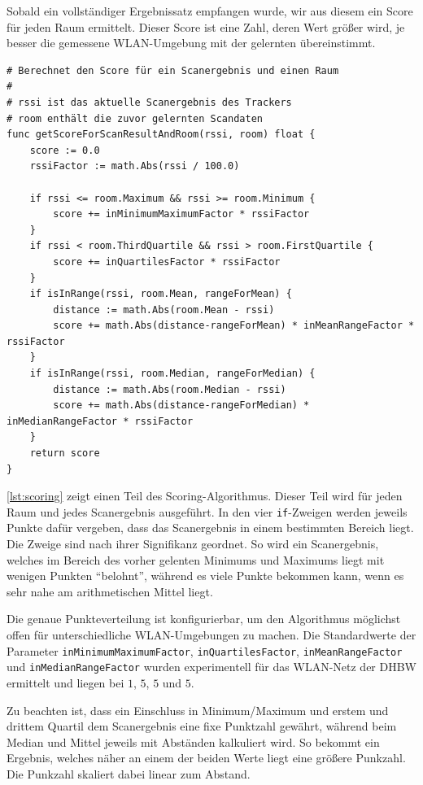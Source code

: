 Sobald ein vollständiger Ergebnissatz empfangen wurde, wir aus diesem ein Score für jeden Raum
ermittelt. Dieser Score ist eine Zahl, deren Wert größer wird, je besser die gemessene
\gls{WLAN}-Umgebung mit der gelernten übereinstimmt.

\begin{lstlisting}[caption={Pseudocode-Beschreibung der Scoring-Funktion},label={lst:scoring},tabsize=2]
# Berechnet den Score für ein Scanergebnis und einen Raum
#
# rssi ist das aktuelle Scanergebnis des Trackers
# room enthält die zuvor gelernten Scandaten
func getScoreForScanResultAndRoom(rssi, room) float {
	score := 0.0
	rssiFactor := math.Abs(rssi / 100.0)

	if rssi <= room.Maximum && rssi >= room.Minimum {
		score += inMinimumMaximumFactor * rssiFactor
	}
	if rssi < room.ThirdQuartile && rssi > room.FirstQuartile {
		score += inQuartilesFactor * rssiFactor
	}
	if isInRange(rssi, room.Mean, rangeForMean) {
		distance := math.Abs(room.Mean - rssi)
		score += math.Abs(distance-rangeForMean) * inMeanRangeFactor * rssiFactor
	}
	if isInRange(rssi, room.Median, rangeForMedian) {
		distance := math.Abs(room.Median - rssi)
		score += math.Abs(distance-rangeForMedian) * inMedianRangeFactor * rssiFactor
	}
	return score
}
\end{lstlisting}

\autoref{lst:scoring} zeigt einen Teil des Scoring-Algorithmus. Dieser Teil wird für jeden Raum und
jedes Scanergebnis ausgeführt. In den vier \texttt{if}-Zweigen werden jeweils Punkte dafür vergeben,
dass das Scanergebnis in einem bestimmten Bereich liegt. Die Zweige sind nach ihrer Signifikanz
geordnet. So wird ein Scanergebnis, welches im Bereich des vorher gelenten Minimums und Maximums
liegt mit wenigen Punkten \enquote{belohnt}, während es viele Punkte bekommen kann, wenn es sehr
nahe am arithmetischen Mittel liegt.

Die genaue Punkteverteilung ist konfigurierbar, um den Algorithmus möglichst offen für
unterschiedliche \gls{WLAN}-Umgebungen zu machen. Die Standardwerte der Parameter
\texttt{inMinimumMaximumFactor}, \texttt{inQuartilesFactor}, \texttt{inMeanRangeFactor} und
\texttt{inMedianRangeFactor} wurden experimentell für das \gls{WLAN}-Netz der \gls{DHBW} ermittelt und liegen
bei $1$, $5$, $5$ und $5$.

Zu beachten ist, dass ein Einschluss in Minimum/Maximum und erstem und drittem Quartil dem
Scanergebnis eine fixe Punktzahl gewährt, während beim Median und Mittel jeweils mit Abständen
kalkuliert wird. So bekommt ein Ergebnis, welches näher an einem der beiden Werte liegt eine größere
Punkzahl. Die Punkzahl skaliert dabei linear zum Abstand.


